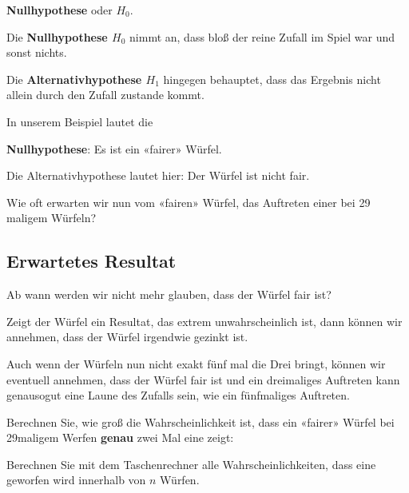 \begin{center}\textbf{Nullhypothese} oder {$H_0$}.\end{center}

Die \textbf{Nullhypothese $H_0$} nimmt an, dass bloß der reine Zufall
im Spiel war und sonst nichts.

Die \textbf{Alternativhypothese $H_1$} hingegen behauptet, dass das
Ergebnis nicht allein durch den Zufall zustande kommt.

In unserem Beispiel lautet die

\textbf{Nullhypothese}: Es ist ein «fairer» Würfel.

Die Alternativhypothese lautet hier: Der Würfel ist nicht fair.

Wie oft erwarten wir nun vom «fairen» Würfel, das Auftreten
einer  bei 29 maligem Würfeln?


\newpage
\subsection{Erwartetes Resultat}
Ab wann werden wir nicht mehr glauben, dass der Würfel fair ist?

Zeigt der Würfel ein Resultat, das extrem unwahrscheinlich ist, dann
können wir annehmen, dass der Würfel irgendwie gezinkt ist.

Auch wenn der Würfeln nun nicht exakt fünf mal die Drei bringt, können
wir eventuell annehmen, dass der Würfel fair ist und ein dreimaliges
Auftreten kann genausogut eine Laune des Zufalls sein, wie ein
fünfmaliges Auftreten.

Berechnen Sie, wie groß die Wahrscheinlichkeit ist, dass ein «fairer»
Würfel bei 29maligem Werfen \textbf{genau} zwei Mal eine 
zeigt:


Berechnen Sie mit dem Taschenrechner alle Wahrscheinlichkeiten, dass
eine  geworfen wird innerhalb von $n$ Würfen.

